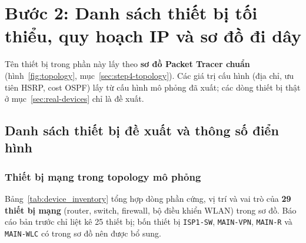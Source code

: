\section{Bước 2: Danh sách thiết bị tối thiểu, quy hoạch IP và sơ đồ đi dây}
\label{sec:step2}

Tên thiết bị trong phần này lấy theo \textbf{sơ đồ Packet Tracer chuẩn} (hình~\ref{fig:topology}, mục~\ref{sec:step4-topology}). Các giá trị cấu hình (địa chỉ, ưu tiên HSRP, cost OSPF) lấy từ cấu hình mô phỏng đã xuất; các dòng thiết bị thật ở mục~\ref{sec:real-devices} chỉ là đề xuất.

\subsection{Danh sách thiết bị đề xuất và thông số điển hình}

\subsubsection{Thiết bị mạng trong topology mô phỏng}
Bảng~\ref{tab:device_inventory} tổng hợp dòng phần cứng, vị trí và vai trò của \textbf{29 thiết bị mạng} (router, switch, firewall, bộ điều khiển WLAN) trong sơ đồ. Báo cáo bản trước chỉ liệt kê 25 thiết bị; bốn thiết bị \texttt{ISP1-SW}, \texttt{MAIN-VPN}, \texttt{MAIN-R} và \texttt{MAIN-WLC} có trong sơ đồ nên được bổ sung.


